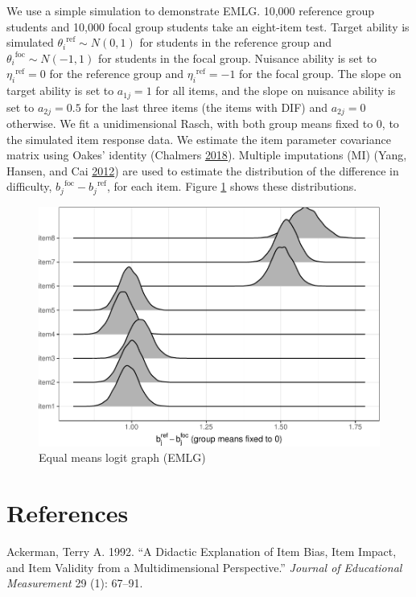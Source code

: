 \documentclass[
  11pt,
]{article}
\begin{document}
We use a simple simulation to demonstrate EMLG. 10,000 reference group students and 10,000 focal group students take an eight-item test. Target ability is simulated \({\theta_i}^{\text{ref}} \sim N(0,1)\) for students in the reference group and \({\theta_i}^{\text{foc}} \sim N(-1,1)\) for students in the focal group. Nuisance ability is set to \({\eta_i}^{\text{ref}} = 0\) for the reference group and \({\eta_i}^{\text{ref}} = -1\) for the focal group. The slope on target ability is set to \(a_{1j} = 1\) for all items, and the slope on nuisance ability is set to \(a_{2j} = 0.5\) for the last three items (the items with DIF) and \(a_{2j} = 0\) otherwise. We fit a unidimensional Rasch, with both group means fixed to 0, to the simulated item response data. We estimate the item parameter covariance matrix using Oakes' identity (Chalmers \protect\hyperlink{ref-chalmers2018numerical}{2018}). Multiple imputations (MI) (Yang, Hansen, and Cai \protect\hyperlink{ref-yang2012characterizing}{2012}) are used to estimate the distribution of the difference in difficulty, \({b_j}^{\text{foc}} - {b_j}^{\text{ref}}\), for each item. Figure \ref{fig:emlg} shows these distributions.

\begin{figure}[H]

{\centering \includegraphics[width=0.7\linewidth]{paper_files/figure-latex/emlg-1} 

}

\caption{Equal means logit graph (EMLG)}\label{fig:emlg}
\end{figure}

\hypertarget{references}{%
\section{References}\label{references}}

\hypertarget{refs}{}
\leavevmode\hypertarget{ref-ackerman1992didactic}{}%
Ackerman, Terry A. 1992. ``A Didactic Explanation of Item Bias, Item Impact, and Item Validity from a Multidimensional Perspective.'' \emph{Journal of Educational Measurement} 29 (1): 67--91.
\end{document}
